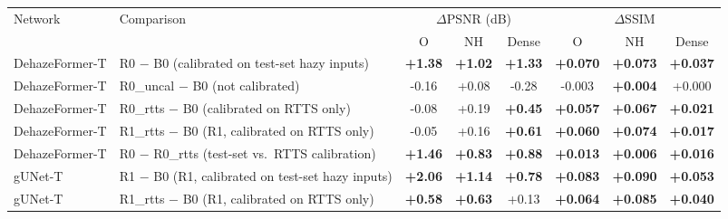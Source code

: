 \begin{tabular}{llcccccc}
\toprule
Network & Comparison & \multicolumn{3}{c}{$\Delta$PSNR (dB)} & \multicolumn{3}{c}{$\Delta$SSIM} \\
\cmidrule(lr){3-5}\cmidrule(lr){6-8}
 & & O & NH & Dense & O & NH & Dense \\
\midrule
DehazeFormer-T & R0 $-$ B0 (calibrated on test-set hazy inputs) & \textbf{+1.38} & \textbf{+1.02} & \textbf{+1.33} & \textbf{+0.070} & \textbf{+0.073} & \textbf{+0.037} \\
DehazeFormer-T & R0\_uncal $-$ B0 (not calibrated) & -0.16 & +0.08 & -0.28 & -0.003 & \textbf{+0.004} & +0.000 \\
DehazeFormer-T & R0\_rtts $-$ B0 (calibrated on RTTS only) & -0.08 & +0.19 & \textbf{+0.45} & \textbf{+0.057} & \textbf{+0.067} & \textbf{+0.021} \\
DehazeFormer-T & R1\_rtts $-$ B0 (R1, calibrated on RTTS only) & -0.05 & +0.16 & \textbf{+0.61} & \textbf{+0.060} & \textbf{+0.074} & \textbf{+0.017} \\
DehazeFormer-T & R0 $-$ R0\_rtts (test-set vs.\ RTTS calibration) & \textbf{+1.46} & \textbf{+0.83} & \textbf{+0.88} & \textbf{+0.013} & \textbf{+0.006} & \textbf{+0.016} \\
\midrule
gUNet-T & R1 $-$ B0 (R1, calibrated on test-set hazy inputs) & \textbf{+2.06} & \textbf{+1.14} & \textbf{+0.78} & \textbf{+0.083} & \textbf{+0.090} & \textbf{+0.053} \\
gUNet-T & R1\_rtts $-$ B0 (R1, calibrated on RTTS only) & \textbf{+0.58} & \textbf{+0.63} & +0.13 & \textbf{+0.064} & \textbf{+0.085} & \textbf{+0.040} \\
\bottomrule
\end{tabular}